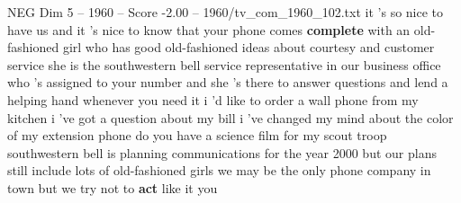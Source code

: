 \begin{textsample}{NEG Dim 5 – 1960 – Score -2.00 – 1960/tv\_com\_1960\_102.txt}  \label{ex:f5_neg_018}
it 's so nice to have us and it 's nice to know that your phone comes \textbf{complete} with an old-fashioned girl who has good old-fashioned ideas about courtesy and customer service she is the southwestern bell service representative in our business office who 's assigned to your number and she 's there to answer questions and lend a helping hand whenever you need it i 'd like to order a wall phone from my kitchen i 've got a question about my bill i 've changed my mind about the color of my extension phone do you have a science film for my scout troop southwestern bell is planning communications for the year 2000 but our plans still include lots of old-fashioned girls we may be the only phone company in town but we try not to \textbf{act} like it you

\end{textsample}

